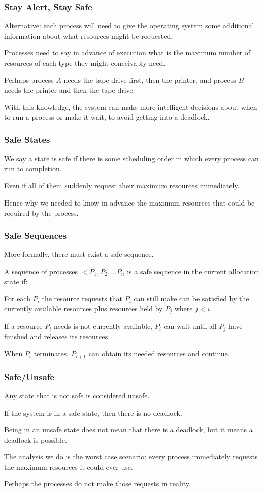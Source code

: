 \begin{frame}
	\frametitle{Stay Alert, Stay Safe}

	Alternative: each process will need to give the operating system some additional information about what resources might be requested.

	Processes need to say in advance of execution what is the maximum number of resources of each type they might conceivably need.

	Perhaps process $A$ needs the tape drive first, then the printer, and process $B$ needs the printer and then the tape drive.

	With this knowledge, the system can make more intelligent decisions about when to run a process or make it wait, to avoid getting into a deadlock.

\end{frame}



\begin{frame}
	\frametitle{Safe States}


	We say a state is \alert{safe} if there is some scheduling order in which every process can run to completion.

	Even if all of them suddenly request their maximum resources immediately.

	Hence why we needed to know in advance the maximum resources that could be required by the process.

\end{frame}

\begin{frame}
	\frametitle{Safe Sequences}

	More formally, there must exist a \alert{safe sequence}.

	A sequence of processes $<P_{1}, P_{2}, ... P_{n}$ is a safe sequence in the current allocation state if:

	For each $P_{i}$ the resource requests that $P_{i}$ can still make can be satisfied by the currently available resources plus resources held by $P_{j}$ where $j < i$.

	If a resource $P_{i}$ needs is not currently available, $P_{i}$ can wait until all $P_{j}$ have finished and releases its resources.

	When $P_{i}$ terminates, $P_{i+1}$ can obtain its needed resources and continue.

\end{frame}

\begin{frame}
	\frametitle{Safe/Unsafe}

	Any state that is not safe is considered \alert{unsafe}.

	If the system is in a safe state, then there is no deadlock.

	Being in an unsafe state does not mean that there is a deadlock, but it means a deadlock is possible.

	The analysis we do is the worst case scenario: every process immediately requests the maximum resources it could ever use.

	Perhaps the processes do not make those requests in reality.

\end{frame}

